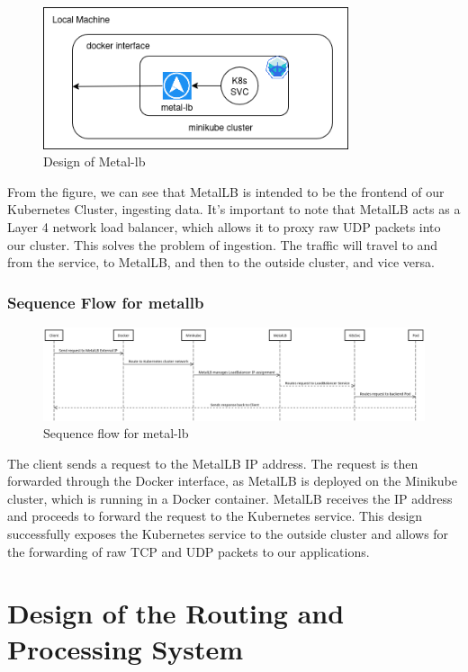 {\begin{figure}[H]
\caption{Design of Metal-lb}
\centering
\includegraphics[width=0.8\textwidth]{Design/metal.png}
\end{figure}

From the figure, we can see that MetalLB is intended to be the frontend of our Kubernetes Cluster, ingesting data. It's important to note that MetalLB acts as a Layer 4 network load balancer, which allows it to proxy raw UDP packets into our cluster. This solves the problem of ingestion. The traffic will travel to and from the service, to MetalLB, and then to the outside cluster, and vice versa.



\subsubsection{Sequence Flow for metallb}
\begin{figure}[H]
\caption{Sequence flow for metal-lb}
\centering
\includegraphics[width=1\textwidth]{Design/metal_sequence.png}
\end{figure}

The client sends a request to the MetalLB IP address. The request is then forwarded through the Docker interface, as MetalLB is deployed on the Minikube cluster, which is running in a Docker container. MetalLB receives the IP address and proceeds to forward the request to the Kubernetes service. This design successfully exposes the Kubernetes service to the outside cluster and allows for the forwarding of raw TCP and UDP packets to our applications.

\section{Design of the Routing and Processing System}

}
